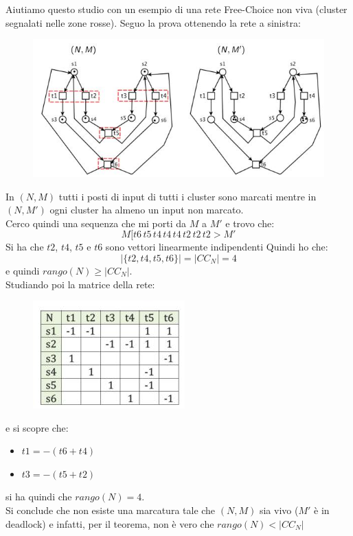 \documentclass[a4paper,12pt, oneside]{book}
\begin{document}
\newpage
\begin{esempio}
  Aiutiamo questo studio con un esempio di una rete Free-Choice non viva
  (cluster segnalati nelle zone rosse). Seguo la prova ottenendo la rete a
  sinistra: 
  \begin{figure}[H]
    \centering
    \includegraphics[scale = 0.5]{img/dim.jpg}
  \end{figure}
  In $(N, M)$ tutti i posti di input di tutti i cluster sono marcati mentre in
  $(N, M')$ ogni cluster ha almeno un input non marcato.\\
  Cerco quindi una sequenza che mi porti da $M$ a $M'$ e trovo che:
  \[M[t6\, t5\, t4\, t4 \,t4 \,t2\, t2 \,t2 > M'\]
  Si ha che $t2$, $t 4$, $t 5$ e $t 6$ sono vettori linearmente indipendenti
  Quindi ho che:
  \[|\{t2,t4,t5,t6\}|=|CC_N| = 4\]
  e quindi $rango(N)\geq |CC_N|$.\\
  Studiando poi la matrice della rete:
  \begin{figure}[H]
    \centering
    \includegraphics[scale = 0.55]{img/dim2.jpg}
  \end{figure}
  e si scopre che:
  \begin{itemize}
    \item $t1=-(t6+t4)$
    \item $t3=-(t5+t2)$
  \end{itemize}
  si ha quindi che $rango(N)=4$.\\
  Si conclude che non esiste una marcatura tale
  che $(N, M)$ sia vivo ($M'$ è in deadlock) e infatti, per il teorema, non è
  vero che $rango(N)<|CC_N|$ 
\end{esempio}
\newpage
\end{document}

